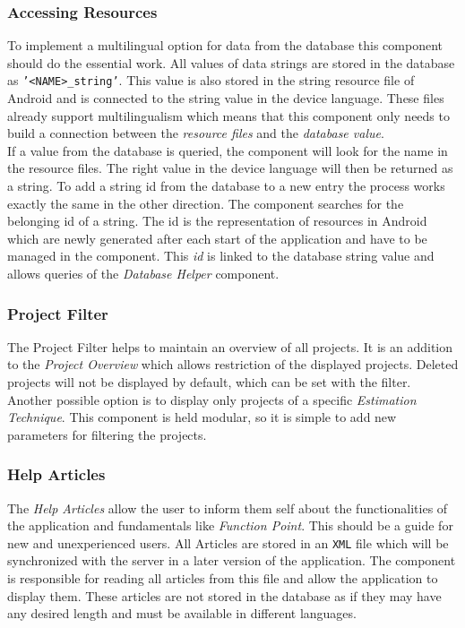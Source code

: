 \subsubsection{\textbf{Accessing Resources}}\label{accessingresources}

To implement a multilingual option for data from the database this component should do the essential work. All values of data strings are stored in the database as \texttt{'<NAME>\_string'}. This value is also stored in the string resource file of Android and is connected to the string value in the device language. These files already support multilingualism which means that this component only needs to build a connection between the \textit{resource files} and the \textit{database value}.\\
If a value from the database is queried, the component will look for the name in the resource files. The right value in the device language will then be returned as a string. To add a string id from the database to a new entry the process works exactly the same in the other direction. The component searches for the belonging id of a string. The id is the representation of resources in Android which are newly generated after each start of the application and have to be managed in the component. This \textit{id} is linked to the database string value and allows queries of the \textit{Database Helper} component. 

\subsubsection{\textbf{Project Filter}}

The Project Filter helps to maintain an overview of all projects. It is an addition to the \textit{Project Overview} which allows restriction of the displayed projects. Deleted projects will not be displayed by default, which can be set with the filter. Another possible option is to display only projects of a specific \textit{Estimation Technique}. This component is held modular, so it is simple to add new parameters for filtering the projects. 

\subsubsection{\textbf{Help Articles}}

The \textit{Help Articles} allow the user to inform them self about the functionalities of the application and fundamentals like \textit{Function Point}. This should be a guide for new and unexperienced users. All Articles are stored in an \texttt{XML} file which will be synchronized with the server in a later version of the application. The component is responsible for reading all articles from this file and allow the application to display them. These articles are not stored in the database as if they may have any desired length and must be available in different languages. 
 
